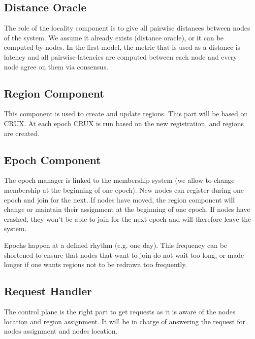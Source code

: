 \documentclass[a4paper,11pt,oneside]{report}
\begin{document}
\subsection{Distance Oracle}

The role of the locality component is to give all pairwise distances between
nodes of the system. We assume it already exists (distance oracle), or it can
be computed by nodes. In the first model, the metric that is used as a distance is latency and all pairwise-latencies are computed
between each node and every node agree on them via consensus. 
 
\subsection{Region Component} This component is used to create and update
regions. This part will be based on CRUX. At each epoch CRUX is run based on
the new registration, and regions are created.
 
\subsection{Epoch Component} The epoch manager is linked to the membership
system (we allow to change membership at the beginning of one epoch). New nodes
can register during one epoch and join for the next. If nodes have moved, the region
component will change or maintain their assignment at the beginning of one
epoch. If nodes have crashed, they won't be able to join for the next epoch and
will therefore leave the system.

Epochs happen at a defined rhythm (e.g. one day). This frequency can be
shortened to ensure that nodes that want to join do not wait too long, or made
longer if one wants regions not to be redrawn too frequently. 

\subsection{Request Handler} The control plane is the right part to get
requests as it is aware of the nodes location and region assignment. It will be
in charge of answering the request for nodes assignment and nodes location. 
\end{document}
